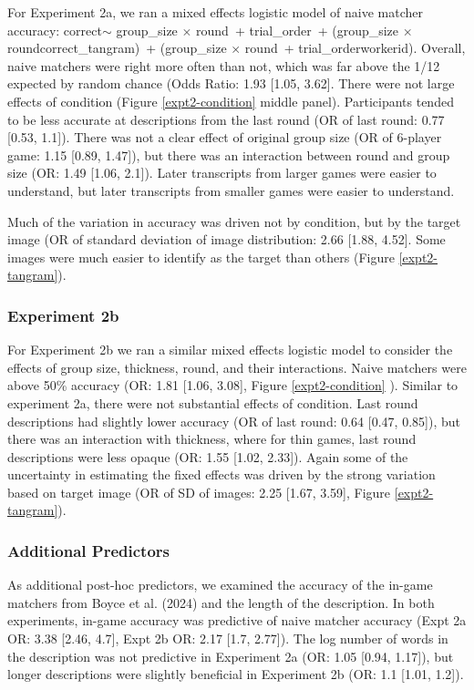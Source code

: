 \documentclass[10pt, letterpaper]{article}
\begin{document}
For Experiment 2a, we ran a mixed effects logistic model of naive
matcher accuracy: correct\(\sim\) group\_size \(\times\) round~+
trial\_order~+ (group\_size \(\times\) round\textbar correct\_tangram)~+
(group\_size \(\times\) round~+ trial\_order\textbar workerid). Overall,
naive matchers were right more often than not, which was far above the
1/12 expected by random chance (Odds Ratio: 1.93 {[}1.05, 3.62{]}. There
were not large effects of condition (Figure \ref{expt2-condition} middle
panel). Participants tended to be less accurate at descriptions from the
last round (OR of last round: 0.77 {[}0.53, 1.1{]}). There was not a
clear effect of original group size (OR of 6-player game: 1.15 {[}0.89,
1.47{]}), but there was an interaction between round and group size (OR:
1.49 {[}1.06, 2.1{]}). Later transcripts from larger games were easier
to understand, but later transcripts from smaller games were easier to
understand.

Much of the variation in accuracy was driven not by condition, but by
the target image (OR of standard deviation of image distribution: 2.66
{[}1.88, 4.52{]}. Some images were much easier to identify as the target
than others (Figure \ref{expt2-tangram}).

\subsubsection{Experiment 2b}\label{experiment-2b-1}

For Experiment 2b we ran a similar mixed effects logistic model to
consider the effects of group size, thickness, round, and their
interactions. Naive matchers were above 50\% accuracy (OR: 1.81 {[}1.06,
3.08{]}, Figure \ref{expt2-condition} ). Similar to experiment 2a, there
were not substantial effects of condition. Last round descriptions had
slightly lower accuracy (OR of last round: 0.64 {[}0.47, 0.85{]}), but
there was an interaction with thickness, where for thin games, last
round descriptions were less opaque (OR: 1.55 {[}1.02, 2.33{]}). Again
some of the uncertainty in estimating the fixed effects was driven by
the strong variation based on target image (OR of SD of images: 2.25
{[}1.67, 3.59{]}, Figure \ref{expt2-tangram}).

\subsubsection{Additional Predictors}\label{additional-predictors}

As additional post-hoc predictors, we examined the accuracy of the
in-game matchers from Boyce et al. (2024) and the length of the
description. In both experiments, in-game accuracy was predictive of
naive matcher accuracy (Expt 2a OR: 3.38 {[}2.46, 4.7{]}, Expt 2b OR:
2.17 {[}1.7, 2.77{]}). The log number of words in the description was
not predictive in Experiment 2a (OR: 1.05 {[}0.94, 1.17{]}), but longer
descriptions were slightly beneficial in Experiment 2b (OR: 1.1 {[}1.01,
1.2{]}).
\end{document}
